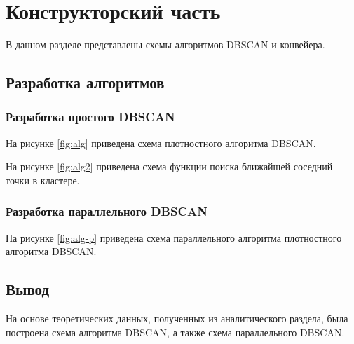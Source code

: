 \chapter{Конструкторский часть}

В данном разделе представлены схемы алгоритмов DBSCAN и конвейера.

\section{Разработка алгоритмов} %

\subsection{Разработка простого DBSCAN}
 
На рисунке \ref{fig:alg} приведена схема плотностного алгоритма DBSCAN.


На рисунке \ref{fig:alg2} приведена схема функции поиска ближайшей соседний точки в кластере.


\subsection{Разработка параллельного DBSCAN}

На рисунке \ref{fig:alg-p} приведена схема параллельного алгоритма плотностного алгоритма DBSCAN. %




\section*{Вывод}

На основе теоретических данных, полученных из аналитического раздела, была построена схема алгоритма DBSCAN, а также схема параллельного DBSCAN.